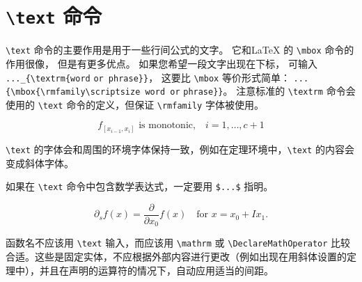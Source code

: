 
\cprotect\chapter{\verb|\text| 命令}
\verb|\text| 命令的主要作用是用于一些行间公式的文字。 它和\LaTeX{} 的 \verb|\mbox| 命令的作用很像，  但是有更多优点。 如果您希望一段文字出现在下标，  可输入 \verb|..._{\textrm{word| \verb|or phrase}}|，  这要比 \verb|\mbox| 等价形式简单：
\verb|...{\mbox{\rmfamily\scriptsize word or|   \verb|phrase}}|。 注意标准的 \verb|\textrm| 命令会使用的 \verb|\text| 命令的定义，但保证 \verb|\rmfamily| 字体被使用。
\begin{tcblisting}{}
\begin{equation}
f_{[x_{i-1},x_i]} \text{ is monotonic,}\quad i=1,\dots,c+1
\end{equation}
\end{tcblisting}

\verb|\text| 的字体会和周围的环境字体保持一致，例如在定理环境中，\verb|\text| 的内容会变成斜体字体。

如果在 \verb|\text| 命令中包含数学表达式，一定要用 \verb|$...$| 指明。
\begin{tcblisting}{}
\[\partial_s f(x) = \frac{\partial}{\partial x_0} f(x) \quad \text{for $x=x_0+Ix_1$.}\]
\end{tcblisting}

函数名不应该用 \verb|\text| 输入，而应该用 \verb|\mathrm| 或 \verb|\DeclareMathOperator| 比较合适。这些是固定实体，不应根据外部内容进行更改（例如出现在用斜体设置的定理中），并且在声明的运算符的情况下，自动应用适当的间距。
